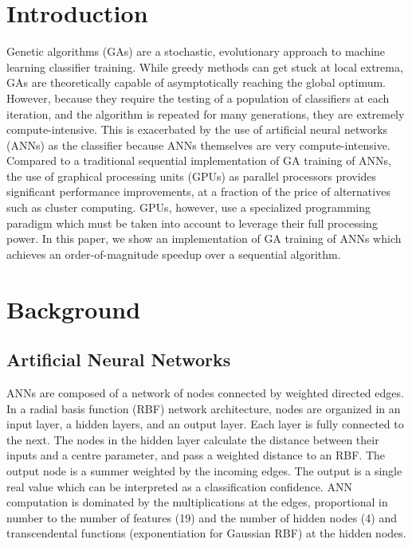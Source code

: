 \documentclass[11pt]{article}       %
\begin{document}
\section{Introduction} \label{intro}
Genetic algorithms (GAs) are a stochastic, evolutionary approach to machine learning classifier training. While greedy methods can get stuck at local extrema, GAs  are theoretically capable of asymptotically reaching the global optimum. However, because they require the testing of a population of classifiers at each iteration, and the algorithm is repeated for many generations, they are extremely compute-intensive. This is exacerbated by the use of artificial neural networks (ANNs) as the classifier because ANNs themselves are very compute-intensive. Compared to a traditional sequential implementation of GA training of ANNs, the use of graphical processing units (GPUs) as parallel processors provides significant performance improvements, at a fraction of the price of alternatives such as cluster computing. GPUs, however, use a specialized programming paradigm which must be taken into account to leverage their full processing power. In this paper, we show an implementation of GA training of ANNs which achieves an order-of-magnitude speedup over a sequential algorithm.

\section{Background} \label{background}

\subsection{Artificial Neural Networks} \label{ann}
ANNs are composed of a network of nodes connected by weighted directed edges. In a radial basis function (RBF) network architecture, nodes are organized in an input layer, a hidden layers, and an output layer. Each layer is fully connected to the next. The nodes in the hidden layer calculate the distance between their inputs and a centre parameter, and pass a weighted distance to an RBF. The output node is a summer weighted by the incoming edges. The output is a single real value which can be interpreted as a classification confidence. ANN computation is dominated by the multiplications at the edges, proportional in number to the number of features (19) and the number of hidden nodes (4) and transcendental functions (exponentiation for Gaussian RBF) at the hidden nodes.
\end{document}
